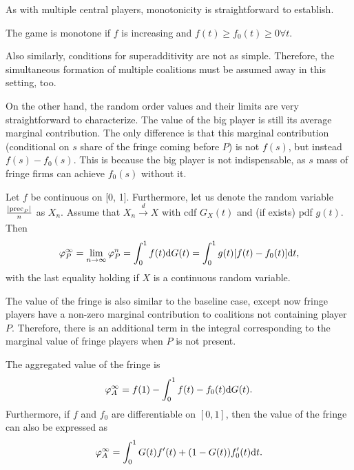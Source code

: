 As with multiple central players, monotonicity is straightforward to establish.
\begin{proposition}
    The game is monotone if $f$ is increasing and $f(t) \geq f_0(t) \geq 0 \forall t$.
\end{proposition}
Also similarly, conditions for superadditivity are not as simple.
Therefore, the simultaneous formation of multiple coalitions must be assumed away in this setting, too.

On the other hand, the random order values and their limits are very straightforward to characterize.
The value of the big player is still its average marginal contribution.
The only difference is that this marginal contribution (conditional on $s$ share of the fringe coming before $P$) is not $f(s)$, but instead $f(s) - f_0(s)$.
This is because the big player is not indispensable, as $s$ mass of fringe firms can achieve $f_0(s)$ without it.

\begin{theorem}
    \label{prop:one_sided_non_indispensable}
    Let $f$ be continuous on [0, 1]. Furthermore, let us denote the random variable $\frac{|\mathrm{prec}_P|}{n}$ as $X_n$. Assume that $X_n \xrightarrow[]{d} X$ with cdf $G_X(t)$ and (if exists) pdf $g(t)$.
    Then
    \begin{align*}
        \varphi_P^\infty = \lim_{n \to \infty} \varphi_P^n = \int_0^1 f(t) \mathrm{d}G(t) = \int_0^1 g(t) [f(t) - f_0(t)] \mathrm{d}t,
    \end{align*}
    with the last equality holding if $X$ is a continuous random variable.
\end{theorem}

The value of the fringe is also similar to the baseline case, except now fringe players have a non-zero marginal contribution  to coalitions not containing player $P$.
Therefore, there is an additional term in the integral corresponding to the marginal value of fringe players when $P$ is not present.

\begin{corollary}
    \label{cor:fringe_value_non_indispensable}
    The aggregated value of the fringe is
    \begin{align*}
        \varphi_A^\infty = f(1) - \int_0^1 f(t) - f_0(t) \mathrm{d}G(t).
    \end{align*}
    Furthermore, if $f$ and $f_0$ are differentiable on $[0, 1]$, then the value of the fringe can also be expressed as
    \begin{align*}
        \varphi_A^\infty = \int_0^1 G(t) f'(t) + (1 - G(t)) f'_0(t) \mathrm{d}t.
    \end{align*}
\end{corollary}

